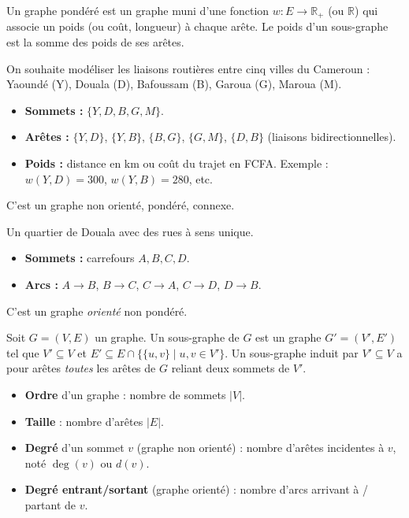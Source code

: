 \documentclass[11pt]{article}
\newcommand{\cle}[1]{{\popxbold\color{popdark}#1}}
\begin{document}
\begin{definition}
Un \cle{graphe pondéré} est un graphe muni d'une fonction $w : E \to \mathbb{R}_+$ (ou $\mathbb{R}$) qui associe un \cle{poids} (ou \cle{coût}, \cle{longueur}) à chaque arête. Le poids d'un sous-graphe est la somme des poids de ses arêtes.
\end{definition}

\begin{exemplebox}
On souhaite modéliser les liaisons routières entre cinq villes du Cameroun : Yaoundé (Y), Douala (D), Bafoussam (B), Garoua (G), Maroua (M).
\begin{itemize}
    \item \textbf{Sommets :} $\{Y, D, B, G, M\}$.
    \item \textbf{Arêtes :} $\{Y, D\}$, $\{Y, B\}$, $\{B, G\}$, $\{G, M\}$, $\{D, B\}$ (liaisons bidirectionnelles).
    \item \textbf{Poids :} distance en km ou coût du trajet en FCFA. Exemple : $w(Y,D)=300$, $w(Y,B)=280$, etc.
\end{itemize}
C'est un graphe non orienté, pondéré, connexe.
\end{exemplebox}

\begin{exemplebox}
Un quartier de Douala avec des rues à sens unique.
\begin{itemize}
    \item \textbf{Sommets :} carrefours $A, B, C, D$.
    \item \textbf{Arcs :} $A \to B$, $B \to C$, $C \to A$, $C \to D$, $D \to B$.
\end{itemize}
C'est un graphe \emph{orienté} non pondéré.
\end{exemplebox}

\begin{definition}
Soit $G=(V,E)$ un graphe. Un \cle{sous-graphe} de $G$ est un graphe $G'=(V',E')$ tel que $V' \subseteq V$ et $E' \subseteq E \cap \{\{u,v\} \mid u,v \in V'\}$.
Un sous-graphe \cle{induit} par $V' \subseteq V$ a pour arêtes \emph{toutes} les arêtes de $G$ reliant deux sommets de $V'$.
\end{definition}

\begin{aretenir}
\begin{itemize}
    \item \textbf{Ordre} d'un graphe : nombre de sommets $|V|$.
    \item \textbf{Taille} : nombre d'arêtes $|E|$.
    \item \textbf{Degré} d'un sommet $v$ (graphe non orienté) : nombre d'arêtes incidentes à $v$, noté $\deg(v)$ ou $d(v)$.
    \item \textbf{Degré entrant/sortant} (graphe orienté) : nombre d'arcs arrivant à / partant de $v$.
\end{itemize}
\end{aretenir}
\end{document}
